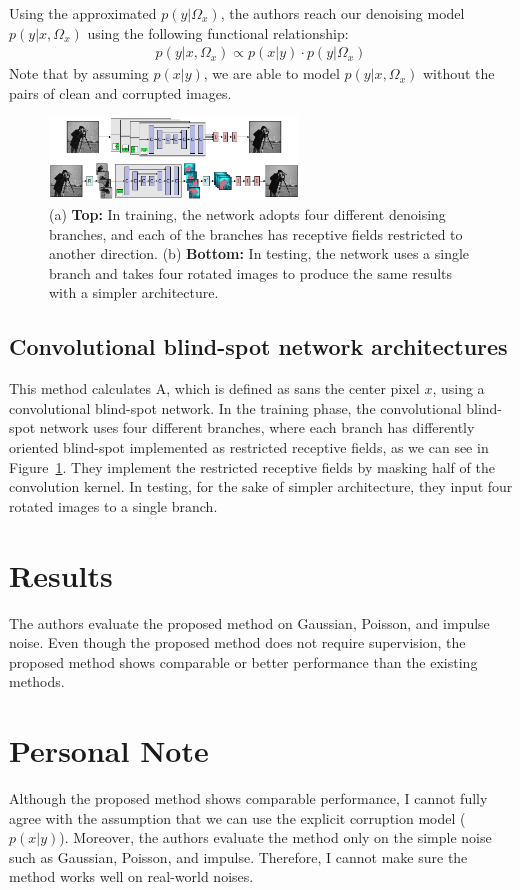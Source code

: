 \documentclass[10pt,twocolumn,letterpaper]{article}
\begin{document}
Using the approximated $p(y | \Omega_x)$, the authors reach our denoising model $p(y | x, \Omega_x)$ using the following functional relationship:
\begin{align*}
	p(y | x, \Omega_x) \propto p(x | y) \cdot p(y | \Omega_x)
\end{align*}
Note that by assuming $p(x | y)$, we are able to model $p(y | x, \Omega_x)$ without the pairs of clean and corrupted images.


\begin{figure}[t]
	\centering
	\includegraphics[width=250px]{assets/outline-3.pdf}
	\caption{(a) \textbf{Top:} In training, the network adopts four different denoising branches, and each of the branches has receptive fields restricted to another direction. (b) \textbf{Bottom:} In testing, the network uses a single branch and takes four rotated images to produce the same results with a simpler architecture.}
	\label{fig:imgs}
\end{figure}

\subsection{Convolutional blind-spot network architectures}
\label{subsec:blind}

This method calculates A, which is defined as sans the center pixel $x$, using a convolutional blind-spot network. In the training phase, the convolutional blind-spot network uses four different branches, where each branch has differently oriented blind-spot implemented as restricted receptive fields, as we can see in Figure~\ref{fig:imgs}. They implement the restricted receptive fields by masking half of the convolution kernel.
In testing, for the sake of simpler architecture, they input four rotated images to a single branch.


\section{Results}

The authors evaluate the proposed method on Gaussian, Poisson, and impulse noise. Even though the proposed method does not require supervision, the proposed method shows comparable or better performance than the existing methods. 

\section{Personal Note}
 
Although the proposed method shows comparable performance, I cannot fully agree with the assumption that we can use the explicit corruption model ($p(x | y)$). Moreover, the authors evaluate the method only on the simple noise such as Gaussian, Poisson, and impulse. Therefore, I cannot make sure the method works well on real-world noises.


% 
% 
\end{document}
